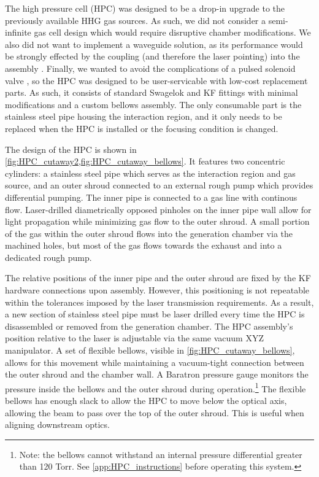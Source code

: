 The high pressure cell (HPC) was designed to be a drop-in upgrade to the previously available HHG gas sources. As such, we did not consider a semi-infinite gas cell design which would require disruptive chamber modifications. We also did not want to implement a waveguide solution, as its performance would be strongly effected by the coupling (and therefore the laser pointing) into the assembly \cite{popmintchevExtendedPhaseMatching2008,popmintchevPhaseMatchingHigh2009}. Finally, we wanted to avoid the complications of a pulsed solenoid valve \cite{evenEvenLavieValveSource2015}, so the HPC was designed to be user-servicable with low-cost replacement parts. As such, it consists of standard Swagelok and KF fittings with minimal modifications and a custom bellows assembly. The only consumable part is the stainless steel pipe housing the interaction region, and it only needs to be replaced when the HPC is installed or the focusing condition is changed.

The design of the HPC is shown in \cref{fig:HPC_cutaway2,fig:HPC_cutaway_bellows}. It features two concentric cylinders: a stainless steel pipe which serves as the interaction region and gas source, and an outer shroud connected to an external rough pump which provides differential pumping. The inner pipe is connected to a gas line with continous flow. Laser-drilled diametrically opposed pinholes on the inner pipe wall allow for light propagation while minimizing gas flow to the outer shroud. A small portion of the gas within the outer shroud flows into the generation chamber via the machined holes, but most of the gas flows towards the exhaust and into a dedicated rough pump.

The relative positions of the inner pipe and the outer shroud are fixed by the KF hardware connections upon assembly. However, this positioning is not repeatable within the tolerances imposed by the laser transmission requirements. As a result, a new section of stainless steel pipe must be laser drilled every time the HPC is disassembled or removed from the generation chamber. The HPC assembly's position relative to the laser is adjustable via the same vacuum XYZ manipulator. A set of flexible bellows, visible in \cref{fig:HPC_cutaway_bellows}, allows for this movement while maintaining a vacuum-tight connection between the outer shroud and the chamber wall. A Baratron pressure gauge monitors the pressure inside the bellows and the outer shroud during operation.\footnote{Note: the bellows cannot withstand an internal pressure differential greater than 120 Torr. See \cref{app:HPC_instructions} before operating this system.} The flexible bellows has enough slack to allow the HPC to move below the optical axis, allowing the beam to pass over the top of the outer shroud. This is useful when aligning downstream optics.

